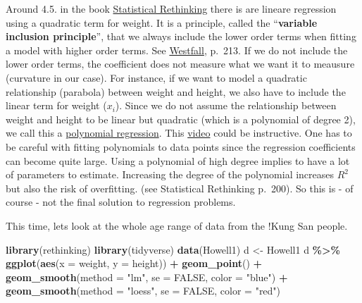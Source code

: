 \documentclass[
]{book}
\newenvironment{Shaded}{\begin{snugshade}}{\end{snugshade}}
\newcommand{\AttributeTok}[1]{\textcolor[rgb]{0.13,0.29,0.53}{#1}}
\newcommand{\ConstantTok}[1]{\textcolor[rgb]{0.56,0.35,0.01}{#1}}
\newcommand{\FunctionTok}[1]{\textcolor[rgb]{0.13,0.29,0.53}{\textbf{#1}}}
\newcommand{\NormalTok}[1]{#1}
\newcommand{\OtherTok}[1]{\textcolor[rgb]{0.56,0.35,0.01}{#1}}
\newcommand{\SpecialCharTok}[1]{\textcolor[rgb]{0.81,0.36,0.00}{\textbf{#1}}}
\newcommand{\StringTok}[1]{\textcolor[rgb]{0.31,0.60,0.02}{#1}}
\begin{document}
Around 4.5. in the book \href{https://civil.colorado.edu/~balajir/CVEN6833/bayes-resources/RM-StatRethink-Bayes.pdf}{Statistical Rethinking}
there is are lineare regression using a quadratic term for weight.
It is a principle, called the ``\textbf{variable inclusion principle}'', that we always include the lower order terms when fitting a model
with higher order terms. See \href{https://vdoc.pub/documents/understanding-regression-analysis-a-conditional-distribution-approach-84oqjr8sqva0}{Westfall},
p.~213. If we do not include the lower order terms, the coefficient does not measure what
we want it to meausure (curvature in our case). For instance, if we want to model a quadratic relationship (parabola) between
weight and height, we also have to include the linear term for weight (\(x_i\)).
Since we do not assume the relationship between weight and height to be linear but
quadratic (which is a polynomial of degree 2), we call this a
\href{https://en.wikipedia.org/wiki/Polynomial_regression\#:~:text=In\%20statistics\%2C\%20polynomial\%20regression\%20is,nth\%20degree\%20polynomial\%20in\%20x.}{polynomial regression}.
This \href{https://www.youtube.com/watch?v=QptI-vDle8Y&ab_channel=MikeXCohen}{video} could be instructive.
One has to be careful with fitting polynomials to data points since the regression coefficients
can become quite large. Using a polynomial of high degree implies to have a lot of parameters
to estimate. Increasing the degree of the polynomial increases \(R^2\) but also the risk of overfitting.
(see Statistical Rethinking p.~200). So this is - of course - not the final solution to regression problems.

This time, lets look at the whole age range of data from the !Kung San people.

\begin{Shaded}
\begin{Highlighting}[]
\FunctionTok{library}\NormalTok{(rethinking)}
\FunctionTok{library}\NormalTok{(tidyverse)}
\FunctionTok{data}\NormalTok{(Howell1)}
\NormalTok{d }\OtherTok{\textless{}{-}}\NormalTok{ Howell1}
\NormalTok{d }\SpecialCharTok{\%\textgreater{}\%} \FunctionTok{ggplot}\NormalTok{(}\FunctionTok{aes}\NormalTok{(}\AttributeTok{x =}\NormalTok{ weight, }\AttributeTok{y =}\NormalTok{ height)) }\SpecialCharTok{+}
  \FunctionTok{geom\_point}\NormalTok{() }\SpecialCharTok{+}
  \FunctionTok{geom\_smooth}\NormalTok{(}\AttributeTok{method =} \StringTok{"lm"}\NormalTok{, }\AttributeTok{se =} \ConstantTok{FALSE}\NormalTok{, }\AttributeTok{color =} \StringTok{"blue"}\NormalTok{) }\SpecialCharTok{+}
  \FunctionTok{geom\_smooth}\NormalTok{(}\AttributeTok{method =} \StringTok{"loess"}\NormalTok{, }\AttributeTok{se =} \ConstantTok{FALSE}\NormalTok{, }\AttributeTok{color =} \StringTok{"red"}\NormalTok{)}
\end{Highlighting}
\end{Shaded}
\end{document}
